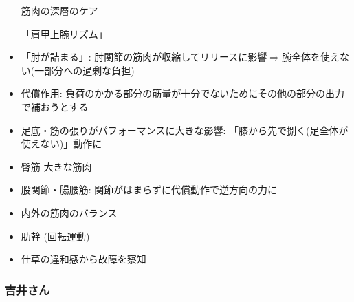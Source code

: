 \documentclass[dvipdfmx, 10.5pt]{jsarticle}
\begin{document}
\begin{itemize}
  筋肉の深層のケア

  「肩甲上腕リズム」

  \item 「肘が詰まる」: 肘関節の筋肉が収縮してリリースに影響$\Rightarrow$腕全体を使えない(一部分への過剰な負担)

  \item 代償作用: 負荷のかかる部分の筋量が十分でないためにその他の部分の出力で補おうとする

  \item 足底・筋の張りがパフォーマンスに大きな影響: 「膝から先で捌く(足全体が使えない)」動作に

  \item 臀筋 大きな筋肉

  \item 股関節・腸腰筋: 関節がはまらずに代償動作で逆方向の力に

  \item 内外の筋肉のバランス

  \item 肋幹 (回転運動)

  \item 仕草の違和感から故障を察知

\end{itemize}

\subsubsection{吉井さん}
\end{document}
